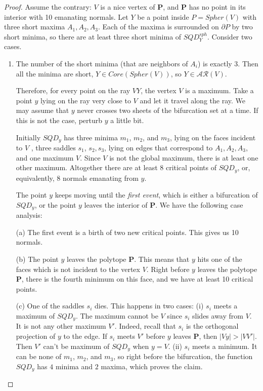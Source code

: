 \documentclass[12pt]{amsart}
\newtheorem*{main lemma}{The main lemma}
\begin{document}
\begin{proof}

Assume the contrary: $V$ is a nice vertex of $\mathbf{P}$, and $\mathbf{P}$ has no point in its interior with 10  emanating normals. Let $Y$ be a point inside $P = Spher(V)$ with three short maxima $A_1, A_2,A_3$. Each of the maxima is surrounded on $\partial P$ by two short minima, so there are at least three short minima of $SQD^{sph}_Y$.  Consider two cases. 

\begin{enumerate}
    \item The number of the short minima (that are neighbors of $A_i$) is exactly $3$. Then all the minima are short, 
 $Y\in Core(Spher(V))$, so $Y\in \mathcal{AR}(V)$.

     Therefore,
for every point on the ray $VY$, the vertex $V$ is a  maximum. Take a point $y$ lying
on the ray very close to $V$ and let it travel along the ray. We may assume that $y$ never crosses two sheets of the bifurcation set at a time. If this is not the case, perturb $y$ a little bit. 

 Initially $SQD_y$ 
has  three minima $m_1$, $m_2$, and $m_3$, lying on the faces incident
to $V$ , three saddles $s_1$, $s_2, s_3$, lying on edges that correspond to $A_1, A_2, A_3$, and one maximum $V$.  Since $V$ is not
 the global maximum, there is at least one other maximum. Altogether there are at least 8 critical points of $SQD_y$, or, equivalently,
8 normals emanating from $y$.

The point $y$ keeps moving until the \textit{first event},  which is either a bifurcation of $SQD_y$,  or  the point $y$ leaves the
interior of $\mathbf{P}$. We have the following case analysis:




(a) The first event is a birth of two new critical points. This gives us 10 normals.

(b)
The point $y$ leaves the polytope $\mathbf{P}$. This means that $y$ hits one
of the faces which is not incident to the vertex $V$. Right before
$y$ leaves the polytope $\mathbf{P}$, there is the  fourth minimum on this face, and we have at least 10 critical points.

(c) One of the saddles $s_i$ dies. This happens in two cases:
(i) $s_i$ meets a  maximum of $SQD_y$. The maximum cannot be $V$ since  $s_i$ slides away from $V$.
It is not any other maximum $V'$. Indeed, recall
that $s_i$ is the orthogonal projection of $y$ to the edge. If $s_i$
meets $V'$ before $y$ leaves $\mathbf{P}$, then $|Vy|>|VV'|$. Then $V'$ can't be maximum of $SQD_y$ when $y=V$.
(ii) $s_i$ meets a minimum. It can be none of $m_1$, $m_2$, and $m_3$, so
right before the bifurcation, the function $SQD_y$ has $4$ minima and $2$ maxima, which proves the claim.


\end{enumerate}
\end{proof}
\end{document}
